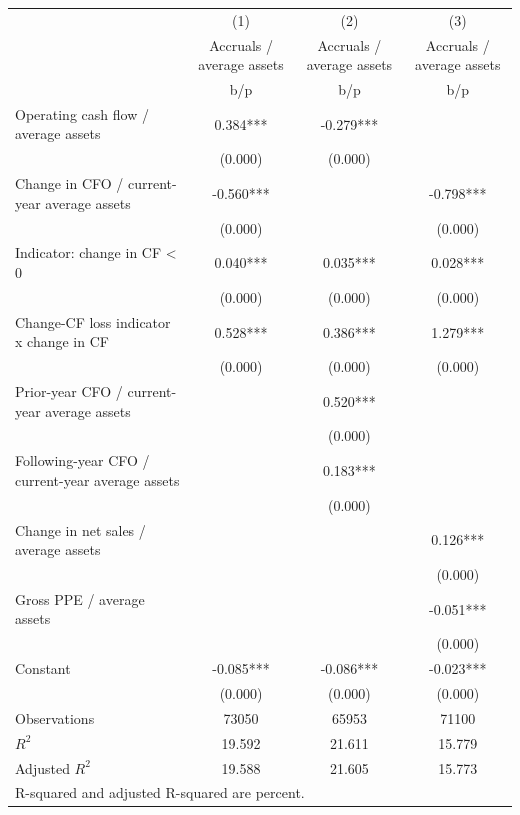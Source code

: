 {
\def\sym#1{\ifmmode^{#1}\else\(^{#1}\)\fi}
\begin{tabular}{l*{3}{c}}
\hline\hline
                    &\multicolumn{1}{c}{(1)}&\multicolumn{1}{c}{(2)}&\multicolumn{1}{c}{(3)}\\
                    &\multicolumn{1}{c}{Accruals / average assets}&\multicolumn{1}{c}{Accruals / average assets}&\multicolumn{1}{c}{Accruals / average assets}\\
                    &         b/p   &         b/p   &         b/p   \\
\hline
Operating cash flow / average assets&       0.384***&      -0.279***&               \\
                    &     (0.000)   &     (0.000)   &               \\
Change in CFO / current-year average assets&      -0.560***&               &      -0.798***\\
                    &     (0.000)   &               &     (0.000)   \\
Indicator: change in CF < 0&       0.040***&       0.035***&       0.028***\\
                    &     (0.000)   &     (0.000)   &     (0.000)   \\
Change-CF loss indicator x change in CF&       0.528***&       0.386***&       1.279***\\
                    &     (0.000)   &     (0.000)   &     (0.000)   \\
Prior-year CFO / current-year average assets&               &       0.520***&               \\
                    &               &     (0.000)   &               \\
Following-year CFO / current-year average assets&               &       0.183***&               \\
                    &               &     (0.000)   &               \\
Change in net sales / average assets&               &               &       0.126***\\
                    &               &               &     (0.000)   \\
Gross PPE / average assets&               &               &      -0.051***\\
                    &               &               &     (0.000)   \\
Constant            &      -0.085***&      -0.086***&      -0.023***\\
                    &     (0.000)   &     (0.000)   &     (0.000)   \\
\hline
Observations        &       73050   &       65953   &       71100   \\
\(R^{2}\)           &      19.592   &      21.611   &      15.779   \\
Adjusted \(R^{2}\)  &      19.588   &      21.605   &      15.773   \\
\hline\hline
\multicolumn{4}{l}{\footnotesize R-squared and adjusted R-squared are percent.}\\
\end{tabular}
}
